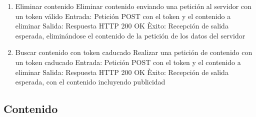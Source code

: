 \documentclass[DIV=calc,paper=a4,fontsize=11pt,onecolumn]{scrartcl}	 %
\begin{document}
{\begin{enumerate}
			\item Eliminar contenido
			\subitem Eliminar contenido enviando una petición al servidor con un token válido
			\subitem Entrada: Petición POST con el token y el contenido a eliminar
			\subitem Salida: Respuesta HTTP 200 OK
			\subitem Èxito: Recepción de salida esperada, eliminándose el contenido de la petición de los datos del servidor
			
			\item Buscar contenido con token caducado
			\subitem Realizar una petición de contenido con un token caducado
			\subitem Entrada: Petición POST con el token y el contenido a eliminar
			\subitem Salida: Respuesta HTTP 200 OK
			\subitem Èxito: Recepción de salida esperada, con el contenido incluyendo publicidad
		\end{enumerate}
	}
	
	\subsection{Contenido}
	
\end{document}
